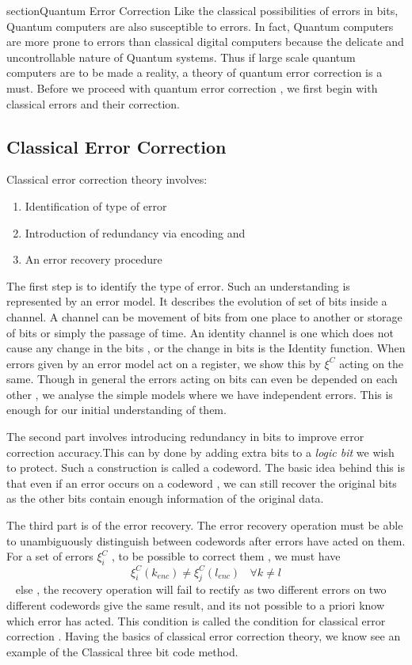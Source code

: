 section{Quantum Error Correction}
Like the classical possibilities of errors in  bits, Quantum computers are also susceptible to errors. In fact, Quantum computers are more prone to errors than classical digital computers because the delicate and uncontrollable nature of Quantum systems. Thus if large scale quantum computers are to be made a reality, a theory of quantum error correction is a must. Before we proceed with quantum error correction , we first begin with classical errors and their correction.
\subsection{Classical Error Correction}
Classical error correction theory involves:
\begin{enumerate}
    \item Identification of type of error
    \item Introduction of redundancy via encoding and
    \item An error recovery procedure
\end{enumerate}
The first step is to identify the type of error. Such an understanding is represented by an error model. It describes the evolution of set of bits inside a channel. A channel can be movement of bits from one place to another or storage of bits or simply the passage of time. An identity channel is one which does not cause any change in the bits , or the change in bits is the Identity function.
When errors given by an error model act on a register, we show this by $\xi^C$ acting on the same. Though in general the errors acting on bits can even be depended on each other , we analyse the simple models where we have independent errors. This is enough for our initial understanding of them.
\par
The second part involves introducing redundancy in bits to improve error correction accuracy.This can by done by adding extra bits to a \textit{logic bit} we wish to protect. Such a construction is called a codeword. The basic idea behind this is that even if an error occurs on a codeword , we can still recover the original bits as the other bits contain enough information of the original data. \par
The third part is of the error recovery. The error recovery operation must be able to unambiguously distinguish between codewords after errors have acted on them. For a set of errors $\xi^C_i$ , to be possible to correct them , we must have 
$$\xi^C_i (k_{enc}) \neq \xi^C_j(l_{enc}) ~~~~\forall k\neq l$$~
else , the recovery operation will fail to rectify as two different errors on two different codewords give the same result, and its not possible to a priori know which error has acted. This condition is called the condition for classical error correction . Having the basics of classical error correction theory, we know see an example of the Classical three bit code method.
